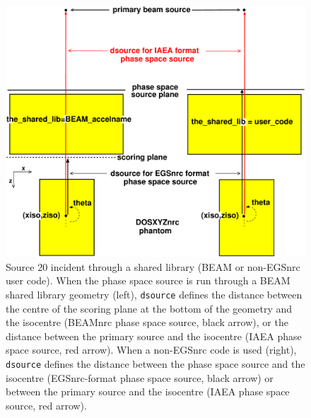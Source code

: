 \documentclass[12pt,twoside]{article}      %
\begin{document}
\begin{figure}[htbp]
\begin{center}
\hspace*{-1cm}\includegraphics[width=17cm]{figures/src20_1}
\caption{Source 20 incident through a shared library (BEAM or non-EGSnrc user code).  When
the phase space source is run through a BEAM shared library geometry (left), {\tt dsource} defines
the distance between the centre of the scoring plane at the bottom of the geometry and the isocentre (BEAMnrc
phase space source, black arrow), or the distance between the primary source and the isocentre (IAEA phase
space source, red arrow).
When a non-EGSnrc code is used (right), {\tt dsource} defines the distance between the phase space source
and the isocentre (EGSnrc-format phase space source, black arrow) or between the primary source and the isocentre (IAEA phase space
source, red arrow).}
\label{fig_src20_1}
\end{center}
\end{figure}
\end{document}
